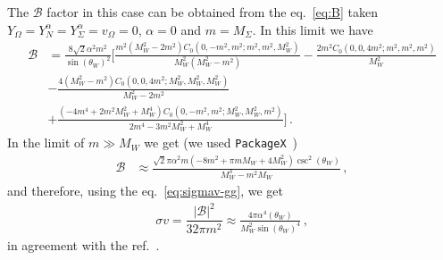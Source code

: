 \documentclass[12pt,letterpaper]{article}
\begin{document}
The $\mathcal{B}$ factor in this case can be obtained from the eq.~\ref{eq:B} taken $Y_{\Omega}=Y_{N}^{\alpha}=Y_{\Sigma}^{\alpha}=v_{\Omega}=0$, $\alpha =0$ and $m=M_{\Sigma}$. In this limit we have
\begin{align}
\mathcal{B} &=
\frac{8 \sqrt{2} \alpha ^2 m^2}{\sin(\theta_W)^2}
\bigg[
\frac{m^2 \left(M_W^2-2 m^2\right) C_0\left(0,-m^2,m^2;m^2,m^2,M_W^2\right)}{M_W^2 \left(M_W^2-m^2\right)}-\frac{2 m^2 C_0\left(0,0,4 m^2;m^2,m^2,m^2\right)}{M_W^2}\nonumber\\
&-\frac{4 \left(M_W^2-m^2\right) C_0\left(0,0,4
   m^2;M_W^2,M_W^2,M_W^2\right)}{M_W^2-2 m^2}\nonumber\\
   &+\frac{\left(-4 m^4+2 m^2 M_W^2+M_W^4\right) C_0\left(0,-m^2,m^2;M_W^2,M_W^2,m^2\right)}{2 m^4-3 m^2 M_W^2+M_W^4}
\bigg]\,.
\end{align}
In the limit of $m\gg M_W$ we get (we used \texttt{PackageX}~\cite{Patel:2015tea}) 
\begin{align}
\mathcal{B} 
&\approx \frac{\sqrt{2} \pi  \alpha ^2 m \left(-8 m^2+\pi  m M_W+4 M_W^2\right) \csc ^2\left(\theta _W\right)}{M_W^3-m^2 M_W}\,,
\end{align}
and therefore, using the eq.~\ref{eq:sigmav-gg}, we get 
\begin{align}
\sigma v = \dfrac{|\mathcal{B}|^2}{32\pi m^2}\approx
\frac{4 \pi  \alpha ^4 \left(\theta _W\right)}{M_W^2 \sin(\theta_W)^4}\,,
\end{align}
in agreement with the ref.~\cite{Cirelli:2005uq}.











\end{document}
